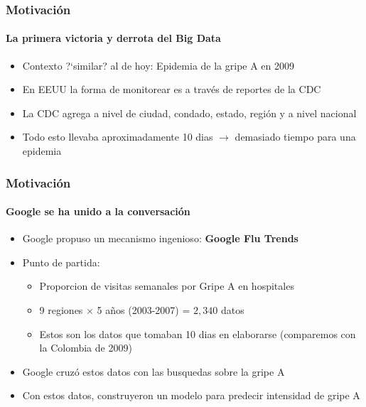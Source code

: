 \documentclass[
  shownotes,
  xcolor={svgnames},
  hyperref={colorlinks,citecolor=DarkBlue,linkcolor=DarkRed,urlcolor=DarkBlue}
  ]{beamer}
\begin{document}
\begin{frame}
\frametitle{Motivación}
\framesubtitle{La primera victoria y derrota del Big Data}

\begin{itemize}
  \item Contexto ?`similar? al de hoy: Epidemia de la gripe A en 2009
  \medskip
  \item En EEUU la forma de monitorear es a través de reportes de la CDC 
  \medskip
  \item La CDC agrega a nivel de ciudad, condado, estado, región y a nivel nacional
  \medskip
  \item Todo esto llevaba aproximadamente 10 dias $\rightarrow$ demasiado tiempo para una epidemia
\end{itemize}
\end{frame}


\begin{frame}
\frametitle{Motivación}
\framesubtitle{Google se ha unido a la conversación}

\begin{itemize}
  \item Google propuso un mecanismo ingenioso: {\bf Google Flu Trends}
  \bigskip
  \item Punto de partida: 
  \begin{itemize}
    \item Proporcion de visitas semanales por Gripe A en hospitales 
    \item 9 regiones $\times$ 5 años (2003-2007) = $2,340$ datos
    \item Estos son los datos que tomaban 10 dias en elaborarse (comparemos con la Colombia de 2009)
  \end{itemize}
  \bigskip
  \item Google cruzó estos datos con las busquedas sobre la gripe A
  \bigskip
  \item Con estos datos, construyeron un modelo para predecir intensidad de gripe A  
\end{itemize}  

\end{frame}

\end{document}
